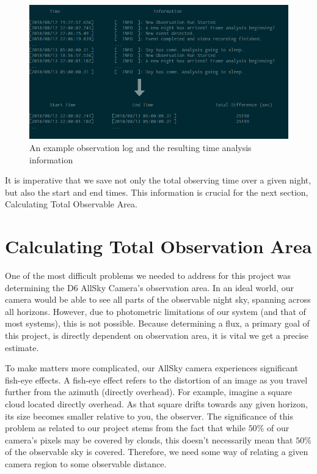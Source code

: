 \begin{figure}[ht!]
  \centering
  \includegraphics[scale=0.53]{images/obslog_time.png}
  \caption{An example observation log and the resulting time analysis information}
  \label{obslog_time}
\end{figure}

It is imperative that we save not only the total observing time over a given night, but also the start and end times.
This information is crucial for the next section, Calculating Total Observable Area.

\section{Calculating Total Observation Area}

One of the most difficult problems we needed to address for this project was determining the D6 AllSky Camera's observation area.  
In an ideal world, our camera would be able to see all parts of the observable night sky, spanning across all horizons.  
However, due to photometric limitations of our system (and that of most systems), this is not possible. 
Because determining a flux, a primary goal of this project, is directly dependent on observation area, it is vital we get a precise estimate.

To make matters more complicated, our AllSky camera experiences significant fish-eye effects.  
A fish-eye effect refers to the distortion of an image as you travel further from the azimuth (directly overhead).  
For example, imagine a square cloud located directly overhead.  
As that square drifts towards any given horizon, its size becomes smaller relative to you, the observer.  
The significance of this problem as related to our project stems from the fact that while $50\% $ of our camera's pixels may be covered by clouds, this doesn't necessarily mean that $50\%$ of the observable sky is covered.
Therefore, we need some way of relating a given camera region to some observable distance.

